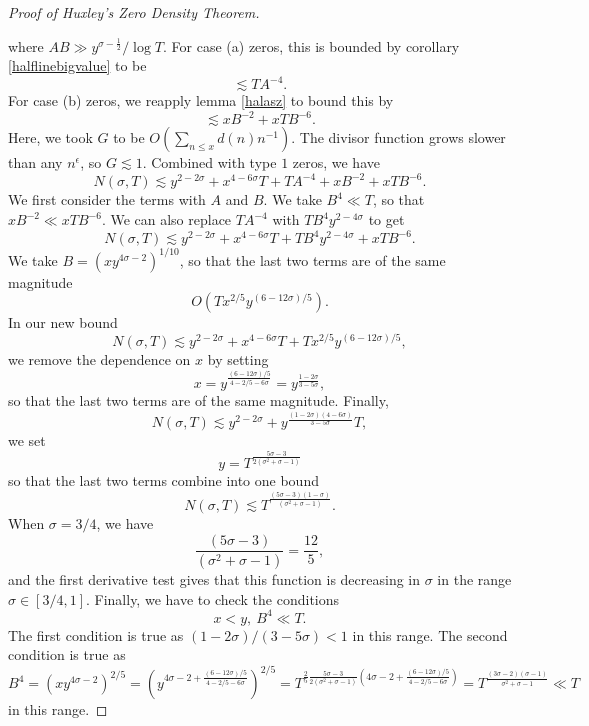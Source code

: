 \begin{proof}[Proof of Huxley's Zero Density Theorem]
\begin{enumerate}[label=(\alph*)]
    \end{enumerate}
    where $AB\gg y^{\sigma-\frac{1}{2}}/\log T$. For case (a) zeros, this is bounded by corollary \ref{halflinebigvalue} to be \[
        \lesssim TA^{-4}.
    \]
    For case (b) zeros, we reapply lemma \ref{halasz} to bound this by \[
    \lesssim xB^{-2}+xTB^{-6}.
    \]Here, we took $G$ to be $O(\sum_{n\leq x} d(n)n^{-1})$. The divisor function grows slower than any $n^\epsilon$, so $G\lesssim 1$. Combined with type $1$ zeros, we have\[
    N(\sigma, T)\lesssim y^{2-2\sigma} + x^{4-6\sigma}T+TA^{-4}+xB^{-2}+xTB^{-6}.
    \]
    We first consider the terms with $A$ and $B$. We take $B^4\ll T$, so that $xB^{-2} \ll xTB^{-6}$. We can also replace $TA^{-4}$ with $TB^4y^{2-4\sigma}$ to get \[
    N(\sigma, T)\lesssim y^{2-2\sigma} + x^{4-6\sigma}T+TB^4y^{2-4\sigma}+xTB^{-6}.
    \]
    We take $B=(xy^{4\sigma-2})^{1/10}$, so that the last two terms are of the same magnitude \[
    O(Tx^{2/5}y^{(6-12\sigma)/5}).
    \]In our new bound \[
    N(\sigma, T)\lesssim y^{2-2\sigma} + x^{4-6\sigma}T+Tx^{2/5}y^{(6-12\sigma)/5},
    \]
    we remove the dependence on $x$ by setting \[
    x=y^{\frac{(6-12\sigma)/5}{4-2/5 - 6\sigma}}=y^{\frac{1-2\sigma}{3-5\sigma}},
    \]
    so that the last two terms are of the same magnitude.
    Finally, \[
    N(\sigma, T)\lesssim y^{2-2\sigma} + y^{\frac{(1-2\sigma)(4-6\sigma)}{3-5\sigma}}T,
    \]
    we set \[
    y=T^{\frac{5\sigma-3}{2(\sigma^2+\sigma-1)}}
    \] so that the last two terms combine into one bound\[
        N(\sigma, T)\lesssim T^{\frac{(5\sigma-3)(1-\sigma)}{(\sigma^2+\sigma-1)}}.
    \]
    When $\sigma=3/4$, we have \[
        \frac{(5\sigma-3)}{(\sigma^2+\sigma-1)}=\frac{12}{5},
    \]
    and the first derivative test gives that this function is decreasing in $\sigma$ in the range $\sigma\in [3/4,1]$.
    Finally, we have to check the conditions \[
    x<y,\ B^4\ll T.
    \]
    The first condition is true as $(1-2\sigma)/(3-5\sigma) < 1$ in this range. The second condition is true as \[
    B^4=(xy^{4\sigma-2})^{2/5}=(y^{4\sigma-2+\frac{(6-12\sigma)/5}{4-2/5 - 6\sigma}})^{2/5}= T^{\frac{2}{5}\frac{5\sigma-3}{2(\sigma^2+\sigma-1)}(4\sigma-2+\frac{(6-12\sigma)/5}{4-2/5 - 6\sigma})}= T^{\frac{(3\sigma-2)(\sigma-1)}{\sigma^2+\sigma-1}}\ll T
    \] in this range.
\end{proof}
